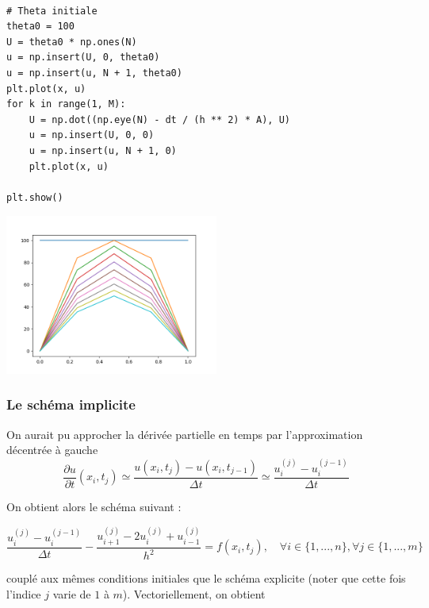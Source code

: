 \documentclass{beamer}
\begin{document}
 \begin{frame}[fragile] 
\begin{verbatim}

# Theta initiale
theta0 = 100
U = theta0 * np.ones(N)
u = np.insert(U, 0, theta0)
u = np.insert(u, N + 1, theta0)
plt.plot(x, u)
for k in range(1, M):
    U = np.dot((np.eye(N) - dt / (h ** 2) * A), U)
    u = np.insert(U, 0, 0)
    u = np.insert(u, N + 1, 0)
    plt.plot(x, u)

plt.show()
  \end{verbatim}

\end{frame}

\begin{frame}
 \begin{center}
\includegraphics[width=7cm]{chaleur1.png}
\end{center}
\end{frame}
  
  
  
\begin{frame}    
  \frametitle{Le schéma implicite}
On aurait pu approcher la dérivée partielle en temps par l'approximation décentrée à gauche
\[\frac{\partial u}{\partial t}(x_i,t_j) \simeq \frac{u(x_{i},t_{j})-u(x_{i},t_{j-1})}{\Delta t}\simeq
\frac{u_{i}^{(j)}-u_{i}^{(j-1)} }{\Delta t}\]


On obtient alors le schéma suivant :

\[
\frac{u_{i}^{(j)}-u_{i}^{(j-1)} }{\Delta t} - \frac{u_{i+1}^{(j)}-2u_{i}^{(j)}+u_{i-1}^{(j)}}{h^2} = f(x_i,t_j), \quad \forall i\in\{1,...,n\} ,  \forall j\in\{1,...,m\} 
\]

couplé aux mêmes conditions initiales que le schéma explicite (noter que cette fois l'indice $j$ varie de $1$ à $m$). Vectoriellement, on obtient
 \end{frame} 
  
\end{document}
